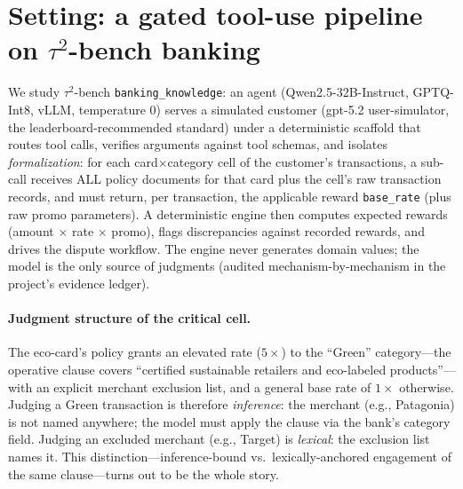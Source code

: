 \section{Setting: a gated tool-use pipeline on $\tau^2$-bench banking}
\label{sec:setting}

We study $\tau^2$-bench \texttt{banking\_knowledge}: an agent (Qwen2.5-32B-Instruct, GPTQ-Int8, vLLM,
temperature 0) serves a simulated customer (gpt-5.2 user-simulator, the leaderboard-recommended standard) under
a deterministic scaffold that routes tool calls, verifies arguments against tool schemas, and isolates
\emph{formalization}: for each card$\times$category cell of the customer's transactions, a sub-call receives
ALL policy documents for that card plus the cell's raw transaction records, and must return, per transaction,
the applicable reward \texttt{base\_rate} (plus raw promo parameters). A deterministic engine then computes
expected rewards (amount $\times$ rate $\times$ promo), flags discrepancies against recorded rewards, and
drives the dispute workflow. The engine never generates domain values; the model is the only source of
judgments (audited mechanism-by-mechanism in the project's evidence ledger).

\paragraph{Judgment structure of the critical cell.}
The eco-card's policy grants an elevated rate ($5\times$) to the ``Green'' category---the operative clause
covers ``certified sustainable retailers and eco-labeled products''---with an explicit merchant exclusion
list, and a general base rate of $1\times$ otherwise. Judging a Green transaction is therefore
\emph{inference}: the merchant (e.g., Patagonia) is not named anywhere; the model must apply the clause via the
bank's category field. Judging an excluded merchant (e.g., Target) is \emph{lexical}: the exclusion list names
it. This distinction---inference-bound vs.\ lexically-anchored engagement of the same clause---turns out to be
the whole story.
